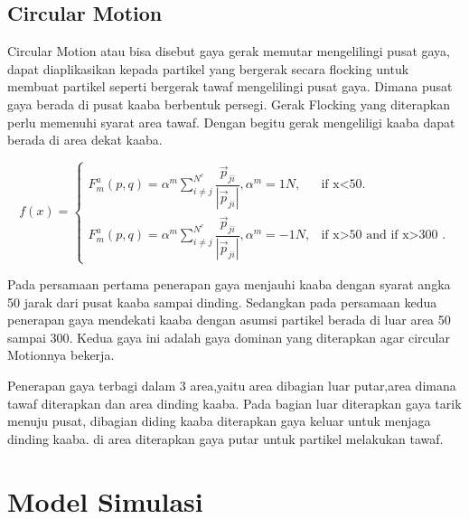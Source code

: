 \subsection{Circular Motion}\label{sec:circularmotion}
\hspace{0.5cm}Circular Motion atau bisa disebut gaya gerak memutar mengelilingi pusat gaya, dapat diaplikasikan kepada partikel yang bergerak secara flocking untuk membuat partikel seperti bergerak tawaf mengelilingi pusat gaya. Dimana pusat gaya berada di pusat kaaba berbentuk persegi. Gerak Flocking yang diterapkan perlu memenuhi syarat area tawaf. Dengan begitu gerak mengeliligi kaaba dapat berada di area dekat kaaba.

\[
  f(x)=\begin{cases}
    F_m^a(p,q) = \alpha^m \sum^{N^c}_{i \neq j}\dfrac{\vec{p}_{ji}}{|\vec{p}_{ji}|},\alpha^m = 1N , & \text{if x<50}.\\
    F_m^a(p,q) = \alpha^m \sum^{N^c}_{i \neq j}\dfrac{\vec{p}_{ji}}{|\vec{p}_{ji}|},\alpha^m = -1N, & \text{if x>50 and if x>300 }.
  \end{cases}
\]

\hspace{0.5cm}Pada persamaan pertama penerapan gaya menjauhi kaaba dengan syarat angka 50 jarak dari pusat kaaba sampai dinding. Sedangkan pada persamaan kedua penerapan gaya mendekati kaaba dengan asumsi partikel berada di luar area 50 sampai 300. Kedua gaya ini adalah gaya dominan yang diterapkan agar circular Motionnya bekerja.


\hspace{0.5cm}Penerapan gaya terbagi dalam 3 area,yaitu area dibagian luar putar,area dimana tawaf diterapkan dan area dinding kaaba. Pada bagian luar diterapkan gaya tarik menuju pusat, dibagian diding kaaba diterapkan gaya keluar untuk menjaga dinding kaaba. di area diterapkan gaya putar untuk partikel melakukan tawaf.


\section{Model Simulasi}\label{cha:model simulasi}

